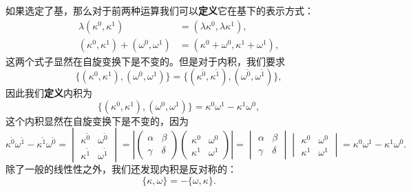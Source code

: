 如果选定了基，那么对于前两种运算我们可以\textbf{定义}它在基下的表示方式：
\begin{equation*}
	\begin{aligned}
		\lambda (\kappa ^{0} ,\kappa ^{1} ) & =(\lambda \kappa ^{0} ,\lambda \kappa ^{1} ),\\
		(\kappa ^{0} ,\kappa ^{1} )+(\omega ^{0} ,\omega ^{1} ) & =(\kappa ^{0} +\omega ^{0} ,\kappa ^{1} +\omega ^{1} ),
	\end{aligned}
\end{equation*}
这两个式子显然在自旋变换下是不变的。但是对于内积，我们要求
\begin{equation*}
	\{(\kappa ^{0} ,\kappa ^{1} ),(\omega ^{0} ,\omega ^{1} )\}=\{(\kappa ^{\tilde{0}} ,\kappa ^{\tilde{1}} ),(\omega ^{\tilde{0}} ,\omega ^{\tilde{1}} )\},
\end{equation*}
因此我们\textbf{定义}内积为
\begin{equation*}
	\{(\kappa ^{0} ,\kappa ^{1} ),(\omega ^{0} ,\omega ^{1} )\}=\kappa ^{0} \omega ^{1} -\kappa ^{1} \omega ^{0} ,
\end{equation*}
这个内积显然在自旋变换下是不变的，因为
\begin{equation*}
	\kappa ^{\tilde{0}} \omega ^{\tilde{1}} -\kappa ^{\tilde{1}} \omega ^{\tilde{0}} =\begin{vmatrix}
		\kappa ^{\tilde{0}} & \omega ^{\tilde{0}}\\
		\kappa ^{\tilde{1}} & \omega ^{\tilde{1}}
	\end{vmatrix} =\left| \begin{pmatrix}
		\alpha  & \beta \\
		\gamma  & \delta 
	\end{pmatrix}\begin{pmatrix}
		\kappa ^{0} & \omega ^{0}\\
		\kappa ^{1} & \omega ^{1}
	\end{pmatrix}\right| =\begin{vmatrix}
		\alpha  & \beta \\
		\gamma  & \delta 
	\end{vmatrix}\begin{vmatrix}
		\kappa ^{0} & \omega ^{0}\\
		\kappa ^{1} & \omega ^{1}
	\end{vmatrix} =\kappa ^{0} \omega ^{1} -\kappa ^{1} \omega ^{0} .
\end{equation*}
除了一般的线性性之外，我们还发现内积是反对称的：
\begin{equation*}
	\{\kappa ,\omega \} =-\{\omega ,\kappa \} .
\end{equation*}
